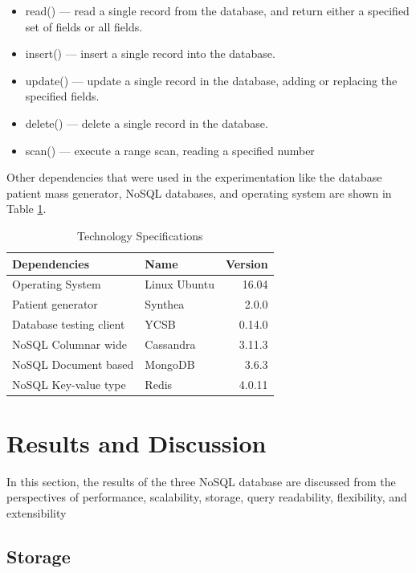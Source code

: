 \documentclass[5p]{elsarticle}
\begin{document}
\begin{itemize}
   \item read() — read a single record from the database, and return either a specified set of fields or all fields.
   \item insert() — insert a single record into the database.
   \item update() — update a single record in the database, adding or replacing the specified fields.
   \item delete() — delete a single record in the database.
   \item scan() — execute a range scan, reading a specified number
\end{itemize}

Other dependencies that were used in the experimentation like the database patient mass generator, NoSQL databases, and operating system are shown in Table \ref{table.technology.versions}. 
	
\begin{table}[h]
    \centering															
    \caption{Technology Specifications}
     \label{table.technology.versions}
     \begin{tabular}{llr}
        \toprule
        Dependencies & Name & Version\\
        \hline
        Operating System        & Linux Ubuntu & 16.04\\
        Patient generator       & Synthea      & 2.0.0\\
        Database testing client & YCSB         & 0.14.0\\
        NoSQL Columnar wide     & Cassandra    & 3.11.3\\
        NoSQL Document based    & MongoDB      & 3.6.3\\
        NoSQL Key-value type    & Redis        & 4.0.11\\
        \hline
    \end{tabular}															
\end{table}


\section{Results and Discussion} In this section, the results of the three NoSQL database are discussed from the perspectives of performance, scalability, storage, query readability, flexibility, and extensibility

\subsection{Storage} 
\end{document}
